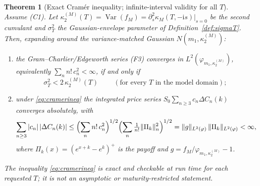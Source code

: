\documentclass[11pt]{article}
\DeclareMathOperator{\Var}{Var}
\newcommand{\Ii}{\mathrm{i}}
\theoremstyle{plain}
\newtheorem{theorem}{Theorem}[section]
\theoremstyle{definition}
\theoremstyle{remark}
\begin{document}
\begin{theorem}[Exact Cramér inequality; infinite-interval validity for all $T$]
\label{thm:cramer}
Assume \textup{(C1)}. Let $\kappa_2^{(M)}(T)=\Var(f_M)=\partial_s^2\kappa_M(T,-\Ii s)
\big|_{s=0}$ be the second cumulant and $\sigma_T^2$ the Gaussian-envelope parameter
of Definition~\ref{def:sigmaT}. Then, expanding around the variance-matched Gaussian
$N(m_1,\kappa_2^{(M)})$:
\begin{enumerate}[label=\textup{(\alph*)},leftmargin=2em]
\item the Gram--Charlier/Edgeworth series \textup{(F3)} converges in
$L^2(\varphi_{m_1,\kappa_2^{(M)}})$, equivalently $\sum_n n!\,c_n^2<\infty$,
if and only if
\begin{equation}\label{eq:cramerineq}
   \boxed{\ \sigma_T^2<2\,\kappa_2^{(M)}(T)\ }\qquad(\text{for every }T\text{ in the model domain});
\end{equation}
\item under \eqref{eq:cramerineq} the integrated price series
$S_0\sum_{n\ge3}c_n\Delta C_n(k)$ converges \emph{absolutely}, with
\begin{equation}\label{eq:priceabs}
   \sum_{n\ge3}|c_n|\,|\Delta C_n(k)|
   \le\Bigl(\sum_n n!\,c_n^2\Bigr)^{1/2}
      \Bigl(\sum_n \tfrac{1}{n!}\|\Pi_k\|_{n}^2\Bigr)^{1/2}
   =\|g\|_{L^2(\varphi)}\,\|\Pi_k\|_{L^2(\varphi)}<\infty,
\end{equation}
where $\Pi_k(x)=(e^{x+k}-e^k)^+$ is the payoff and $g=f_M/\varphi_{m_1,\kappa_2^{(M)}}-1$.
\end{enumerate}
The inequality \eqref{eq:cramerineq} is exact and checkable at run time for each
requested $T$; it is not an asymptotic or maturity-restricted statement.
\end{theorem}
\end{document}
